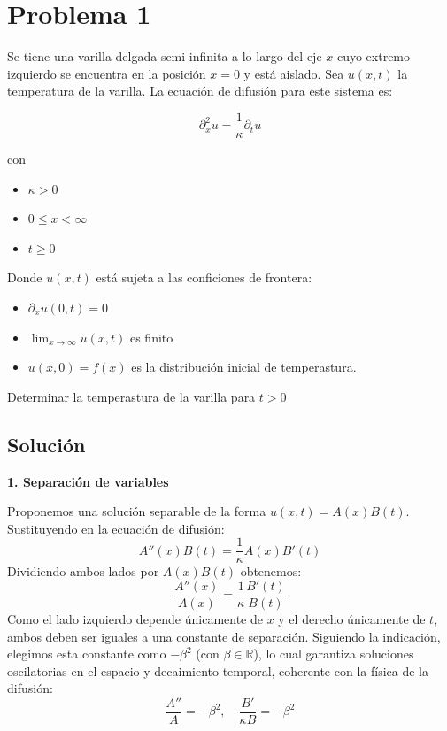 \documentclass[a4paper]{article}
\begin{document}
\section{Problema 1}

Se tiene una varilla delgada semi-infinita a lo largo del eje $x$ cuyo extremo izquierdo se encuentra en la posición $x=0$ y está aislado. Sea $u(x, t)$ la temperatura de la varilla. La ecuación de difusión para este sistema es:

$$\partial_{x}^{2}u = \frac{1}{\kappa} \partial_t u$$

con

\begin{itemize}
	\item $\kappa > 0$
	\item $0\leq x < \infty$
	\item $t\geq 0$
\end{itemize}

Donde $u(x,t)$ está sujeta a las conficiones de frontera:

\begin{itemize}
	\item $\partial_x u(0,t) = 0$
	\item $\displaystyle\lim_{x\to\infty}u(x, t)$ es finito
	\item $u(x, 0) = f(x)$ es la distribución inicial de temperastura.
\end{itemize}

Determinar la temperastura de la varilla para $t>0$


\subsection{Solución}

\textbf{1. Separación de variables}

Proponemos una solución separable de la forma $u(x, t) = A(x)B(t)$. Sustituyendo en la ecuación de difusión:
$$ A''(x)B(t) = \frac{1}{\kappa} A(x)B'(t) $$
Dividiendo ambos lados por $A(x)B(t)$ obtenemos:
$$ \frac{A''(x)}{A(x)} = \frac{1}{\kappa} \frac{B'(t)}{B(t)} $$
Como el lado izquierdo depende únicamente de $x$ y el derecho únicamente de $t$, ambos deben ser iguales a una constante de separación. Siguiendo la indicación, elegimos esta constante como $-\beta^2$ (con $\beta \in \mathbb{R}$), lo cual garantiza soluciones oscilatorias en el espacio y decaimiento temporal, coherente con la física de la difusión:
$$ \frac{A''}{A} = -\beta^2, \quad \frac{B'}{\kappa B} = -\beta^2 $$
\end{document}
